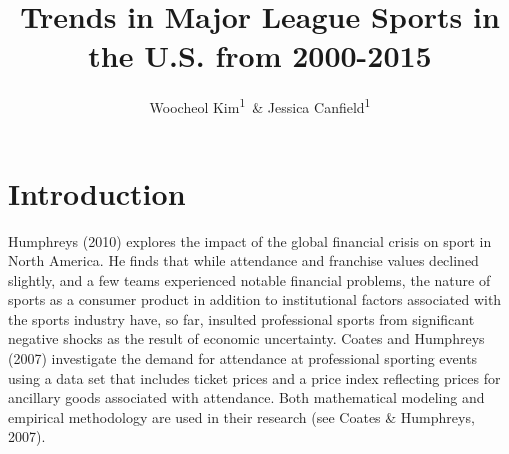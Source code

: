 \documentclass[man, fleqn, noextraspace,floatsintext]{apa6}
\title{Trends in Major League Sports in the U.S. from 2000-2015}
\author{Woocheol Kim\textsuperscript{1}~\& Jessica Canfield\textsuperscript{1}}
\date{}
\affiliation{
\vspace{0.5cm}
\textsuperscript{1} University of Oregon}
\begin{document}
\maketitle

\section{Introduction}\label{introduction}

Humphreys (2010) explores the impact of the global financial crisis on
sport in North America. He finds that while attendance and franchise
values declined slightly, and a few teams experienced notable financial
problems, the nature of sports as a consumer product in addition to
institutional factors associated with the sports industry have, so far,
insulted professional sports from significant negative shocks as the
result of economic uncertainty. Coates and Humphreys (2007) investigate
the demand for attendance at professional sporting events using a data
set that includes ticket prices and a price index reflecting prices for
ancillary goods associated with attendance. Both mathematical modeling
and empirical methodology are used in their research (see Coates \&
Humphreys, 2007).
\end{document}
